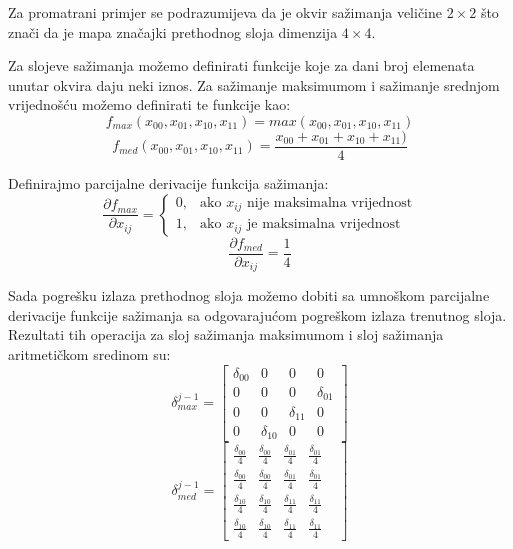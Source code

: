 \documentclass[times, utf8, zavrsni, numeric]{fer}
\begin{document}
Za promatrani primjer se podrazumijeva da je okvir sažimanja veličine $2 \times 2$ što znači da je mapa značajki prethodnog sloja dimenzija $4 \times 4$.

Za slojeve sažimanja možemo definirati funkcije koje za dani broj elemenata unutar okvira daju neki iznos. Za sažimanje maksimumom i sažimanje srednjom vrijednošću možemo definirati te funkcije kao:
\begin{equation}
f_{max}(x_{00}, x_{01}, x_{10}, x_{11}) = max(x_{00}, x_{01}, x_{10}, x_{11})
\end{equation}
\begin{equation}
f_{med}(x_{00}, x_{01}, x_{10}, x_{11}) = \frac{x_{00} + x_{01} + x_{10} + x_{11})}{4}
\end{equation}

Definirajmo parcijalne derivacije funkcija sažimanja:
\begin{equation}
\dfrac{\partial f_{max}}{\partial x_{ij}} = \begin{cases}
    0, & \text{ako $x_{ij}$ nije maksimalna vrijednost}\\
    1, & \text{ako $x_{ij}$ je maksimalna vrijednost}
  \end{cases}
\end{equation}
\begin{equation}
\dfrac{\partial f_{med}}{\partial x_{ij}} = \frac{1}{4}
\end{equation}

Sada pogrešku izlaza prethodnog sloja možemo dobiti sa umnoškom parcijalne derivacije funkcije sažimanja sa odgovarajućom pogreškom izlaza trenutnog sloja. Rezultati tih operacija za sloj sažimanja maksimumom i sloj sažimanja aritmetičkom sredinom su:
\begin{equation}
\delta^{j-1}_{max} = \left[
\begin{matrix}
\delta_{00} & 0 & 0 & 0 \\
0 & 0 & 0 & \delta_{01} \\
0 & 0 & \delta_{11} & 0\\
0 & \delta_{10} & 0 & 0 
\end{matrix}
\right]
\end{equation}
\begin{equation}
\delta^{j-1}_{med} = \left[
\begin{matrix}
\frac{\delta_{00}}{4} & \frac{\delta_{00}}{4} & \frac{\delta_{01}}{4} & \frac{\delta_{01}}{4} & \\
\frac{\delta_{00}}{4} & \frac{\delta_{00}}{4} & \frac{\delta_{01}}{4} & \frac{\delta_{01}}{4} & \\
\frac{\delta_{10}}{4} & \frac{\delta_{10}}{4} & \frac{\delta_{11}}{4} & \frac{\delta_{11}}{4} & \\
\frac{\delta_{10}}{4} & \frac{\delta_{10}}{4} & \frac{\delta_{11}}{4} & \frac{\delta_{11}}{4} &
\end{matrix}
\right]
\end{equation}
\end{document}
